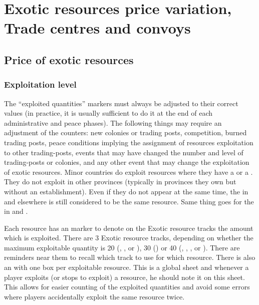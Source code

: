 
\section{Exotic resources price variation, Trade centres and convoys}

\label{chExpenses:Variation}



\subsection{Price of exotic resources}

\label{chExpenses:ExoticResourcesPrices}


\subsubsection{Exploitation level}
 The ``exploited quantities'' markers must
always be adjusted to their correct values (in practice, it is usually
sufficient to do it at the end of each administrative and peace phases).
\bparag The following things may require an adjustment of the counters: new
colonies or trading posts, competition, burned trading posts, peace conditions
implying the assignment of resources exploitation to other trading-posts,
events that may have changed the number and level of trading-posts or
colonies, and any other event that may change the exploitation of exotic
resources.
\bparag Minor \ROTW countries do exploit resources where they have a \TP or a
\COL. They do not exploit in other provinces (typically in provinces they own
but without an establishment).
\bparag Even if they do not appear at the same time, the  in
 and elsewhere is still considered to be the same
resource. Same thing goes for the  in  and
.

 Each resource has an  marker to denote on the Exotic resource tracks the amount which is
exploited.
\bparag There are 3 Exotic resource tracks, depending on whether the maximum
exploitable quantity is 20 (, , 
or ), 30 () or 40 (, ,
,  or ). There are reminders near them to
recall which track to use for which resource.
\bparag There is also an  with one box per
exploitable resource. This is a global sheet and whenever a player exploits
(or stops to exploit) a resource, he should note it on this sheet. This allows
for easier counting of the exploited quantities and avoid some errors where
players accidentally exploit the same resource twice.

